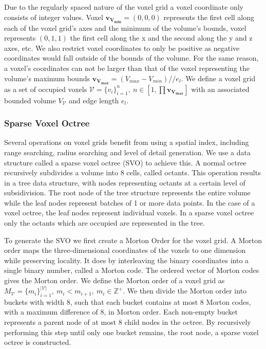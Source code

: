 \documentclass{article}
\begin{document}
Due to the regularly spaced nature of the voxel grid a voxel coordinate only consists of integer values. Voxel \(\boldsymbol{v_{V_{min}}} = (0,0,0)\) represents the first cell along each of the voxel grid's axes and the minimum of the volume's bounds, voxel represents \((0,1,1)\) the first cell along the x and the second along the y and z axes, etc. We also restrict voxel coordinates to only be positive as negative coordinates would fall outside of the bounds of the volume. For the same reason, a voxel's coordinates can not be larger than that of the voxel representing the volume's maximum bounds \(\boldsymbol{v_{V_{max}}} = (V_{max} - V_{min})//e_l\). We define a voxel grid as a set of occupied voxels \(\mathcal{V}=\{v_{i}\}_{i=1}^{n},\ n \in [1, \prod{\boldsymbol{v_{V_{max}}}}]\) with an associated bounded volume \(V_{\mathcal{V}}\) and edge length \(e_{l}\).

\subsubsection{Sparse Voxel Octree}
Several operations on voxel grids benefit from using a spatial index, including range searching, radius searching and level of detail generation. We use a data structure called a sparse voxel octree (SVO) to achieve this. A normal octree recursively subdivides a volume into 8 cells, called octants. This operation results in a tree data structure, with nodes representing octants at a certain level of subsidivision. The root node of the tree structure represents the entire volume while the leaf nodes represent batches of 1 or more data points. In the case of a voxel octree, the leaf nodes represent individual voxels. In a sparse voxel octree only the octants which are occupied are represented in the tree. 

To generate the SVO we first create a Morton Order for the voxel grid. A Morton order maps the three-dimensional coordinates of the voxels to one dimension while preserving locality. It does by interleaving the binary coordinates into a single binary number, called a Morton code. The ordered vector of Morton codes gives the Morton order. We define the Morton order of a voxel grid as \(M_{\mathcal{V}}=\{m_i\}_{i=1}^{|\mathcal{V}|},\ m_i < m_{i+1},\ m_i \in \mathbb{Z^+}\). We then divide the Morton order into buckets with width 8, such that each bucket contains at most 8 Morton codes, with a maximum difference of 8, in Morton order. Each non-empty bucket represents a parent node of at most 8 child nodes in the octree. By recursively performing this step until only one bucket remains, the root node, a sparse voxel octree is constructed. 
\end{document}
